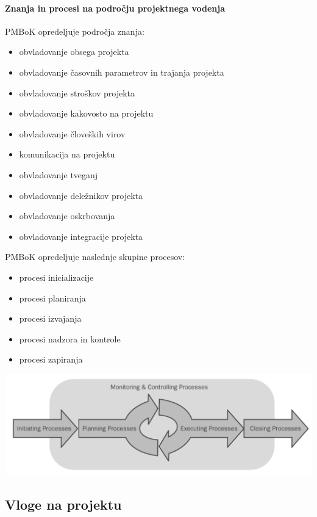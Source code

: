 \documentclass[a4paper,12pt]{report}
\begin{document}
      \paragraph{Znanja in procesi na področju projektnega vodenja} PMBoK opredeljuje področja znanja:
         \begin{itemize}
            \item obvladovanje obsega projekta
            \item obvladovanje časovnih parametrov in trajanja projekta
            \item obvladovanje stroškov projekta
            \item obvladovanje kakovosto na projektu
            \item obvladovanje človeških virov
            \item komunikacija na projektu
            \item obvladovanje tveganj
            \item obvladovanje deležnikov projekta
            \item obvladovanje oskrbovanja
            \item obvladovanje integracije projekta
         \end{itemize}
      PMBoK opredeljuje naslednje skupine procesov:
         \begin{itemize}
            \item procesi inicializacije
            \item procesi planiranja
            \item procesi izvajanja
            \item procesi nadzora in kontrole
            \item procesi zapiranja
         \end{itemize}

         \includegraphics[scale=0.375]{004.png}

   \subsection{Vloge na projektu}
\end{document}

